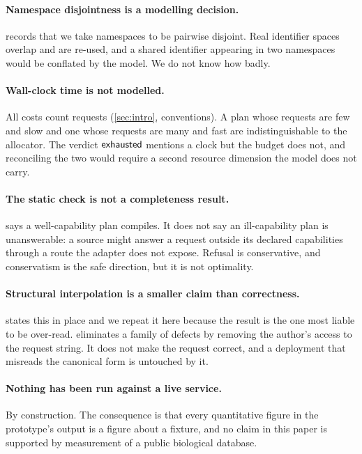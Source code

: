 \paragraph{Namespace disjointness is a modelling decision.} 
records that we take namespaces to be pairwise disjoint. Real identifier spaces
overlap and are re-used, and a shared identifier appearing in two namespaces
would be conflated by the model. We do not know how badly.

\paragraph{Wall-clock time is not modelled.} All costs count requests
(\cref{sec:intro}, conventions). A plan whose requests are few and slow and one
whose requests are many and fast are indistinguishable to the allocator. The
verdict $\textsf{exhausted}$ mentions a clock but the budget does not, and reconciling the
two would require a second resource dimension the model does not carry.

\paragraph{The static check is not a completeness result.} 
says a well-capability plan compiles. It does not say an ill-capability plan is
unanswerable: a source might answer a request outside its declared capabilities
through a route the adapter does not expose. Refusal is conservative, and
conservatism is the safe direction, but it is not optimality.

\paragraph{Structural interpolation is a smaller claim than correctness.}
 states this in place and we repeat it here because the
result is the one most liable to be over-read. 
eliminates a family of defects by removing the author's access to the request
string. It does not make the request correct, and a deployment that misreads the
canonical form is untouched by it.

\paragraph{Nothing has been run against a live service.} By construction. The
consequence is that every quantitative figure in the prototype's output is a
figure about a fixture, and no claim in this paper is supported by measurement
of a public biological database.

